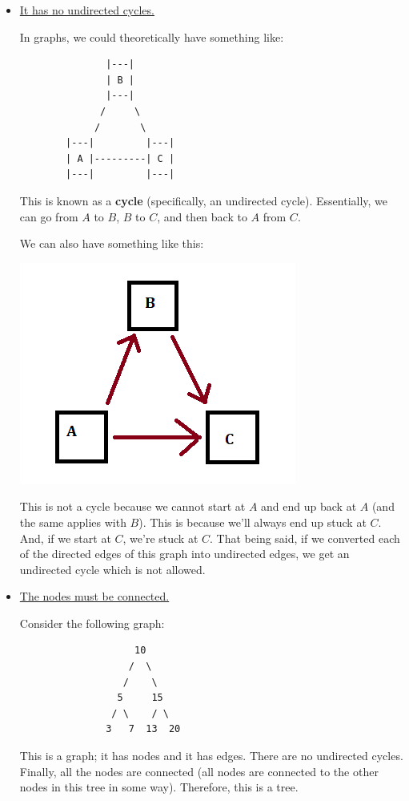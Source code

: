 \documentclass[letterpaper]{article}
\begin{document}
\begin{itemize}
    \item \underline{It has no undirected cycles.}
    
    \bigskip 

    In graphs, we could theoretically have something like: 
    \begin{verbatim}
               |---|
               | B |
               |---|
              /     \
             /       \
        |---|         |---|
        | A |---------| C |
        |---|         |---|
    \end{verbatim}
    This is known as a \textbf{cycle} (specifically, an undirected cycle). Essentially, we can go from $A$ to $B$, $B$ to $C$, and then back to $A$ from $C$.
    
    \bigskip 

    We can also have something like this: 
    \begin{center}
        \includegraphics[scale=0.5]{img/graph_dir_cycle.PNG}
    \end{center}
    This is not a cycle because we cannot start at $A$ and end up back at $A$ (and the same applies with $B$). This is because we'll always end up stuck at $C$. And, if we start at $C$, we're stuck at $C$. That being said, if we converted each of the directed edges of this graph into undirected edges, we get an undirected cycle which is not allowed. 

    \item \underline{The nodes must be connected.} 
    
    \bigskip 

    Consider the following graph: 
    \begin{verbatim}
                    10 
                   /  \
                  /    \
                 5     15
                / \    / \
               3   7  13  20
    \end{verbatim}
    This is a graph; it has nodes and it has edges. There are no undirected cycles. Finally, all the nodes are connected (all nodes are connected to the other nodes in this tree in some way). Therefore, this is a tree. 


\end{itemize}
\end{document}

